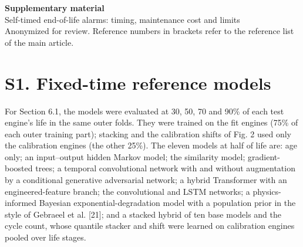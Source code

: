 \documentclass[11pt,a4paper]{article}
\begin{document}
\begin{center}{\Large\bfseries Supplementary material}\\[6pt]{\large Self-timed end-of-life alarms: timing, maintenance cost and limits}\\[6pt]{\small Anonymized for review. Reference numbers in brackets refer to the reference list of the main article.}\end{center}
\section*{S1. Fixed-time reference models}

\noindent For Section 6.1, the models were evaluated at 30, 50, 70 and 90\% of each test engine's life in the same outer folds. They were trained on the fit engines (75\% of each outer training part); stacking and the calibration shifts of Fig. 2 used only the calibration engines (the other 25\%). The eleven models at half of life are: age only; an input--output hidden Markov model; the similarity model; gradient-boosted trees; a temporal convolutional network with and without augmentation by a conditional generative adversarial network; a hybrid Transformer with an engineered-feature branch; the convolutional and LSTM networks; a physics-informed Bayesian exponential-degradation model with a population prior in the style of Gebraeel et al. [21]; and a stacked hybrid of ten base models and the cycle count, whose quantile stacker and shift were learned on calibration engines pooled over life stages.
\end{document}
